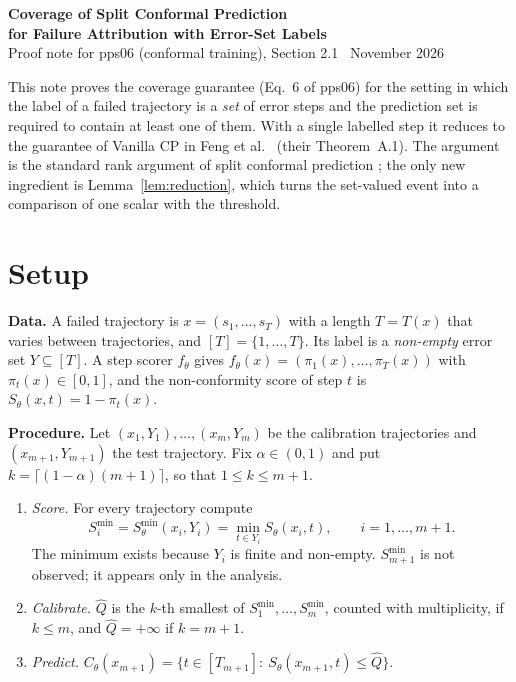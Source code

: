 \documentclass[10pt,a4paper]{article}
\theoremstyle{definition}
\theoremstyle{remark}
\newcommand{\C}{C}
\newcommand{\Qhat}{\widehat Q}
\newcommand{\Smin}{S^{\min}}
\begin{document}
\begin{center}
{\Large\bfseries Coverage of Split Conformal Prediction\\[2pt] for Failure Attribution with Error-Set Labels}\\[4pt]
{\small Proof note for pps06 (conformal training), Section 2.1 \textperiodcentered\ November 2026}
\end{center}

This note proves the coverage guarantee (Eq.~6 of pps06) for the setting in which the label of a failed trajectory is a \emph{set} of error steps and the prediction set is required to contain at least one of them. With a single labelled step it reduces to the guarantee of Vanilla CP in Feng et al.\ \cite{feng2026conformal} (their Theorem~A.1). The argument is the standard rank argument of split conformal prediction \cite{angelopoulos2021gentle}; the only new ingredient is Lemma~\ref{lem:reduction}, which turns the set-valued event into a comparison of one scalar with the threshold.

\section{Setup}

\textbf{Data.} A failed trajectory is $x=(s_1,\dots,s_T)$ with a length $T=T(x)$ that varies between trajectories, and $[T]=\{1,\dots,T\}$. Its label is a \emph{non-empty} error set $Y\subseteq[T]$. A step scorer $f_\theta$ gives $f_\theta(x)=(\pi_1(x),\dots,\pi_T(x))$ with $\pi_t(x)\in[0,1]$, and the non-conformity score of step $t$ is $S_\theta(x,t)=1-\pi_t(x)$.

\textbf{Procedure.} Let $(x_1,Y_1),\dots,(x_m,Y_m)$ be the calibration trajectories and $(x_{m+1},Y_{m+1})$ the test trajectory. Fix $\alpha\in(0,1)$ and put $k=\lceil(1-\alpha)(m+1)\rceil$, so that $1\le k\le m+1$.
\begin{enumerate}
\item \emph{Score.} For every trajectory compute
\begin{equation}
\Smin_i=\Smin_\theta(x_i,Y_i)=\min_{t\in Y_i}S_\theta(x_i,t),\qquad i=1,\dots,m+1. \label{eq:smin}
\end{equation}
The minimum exists because $Y_i$ is finite and non-empty. $\Smin_{m+1}$ is not observed; it appears only in the analysis.
\item \emph{Calibrate.} $\Qhat$ is the $k$-th smallest of $\Smin_1,\dots,\Smin_m$, counted with multiplicity, if $k\le m$, and $\Qhat=+\infty$ if $k=m+1$.
\item \emph{Predict.} $\C_\theta(x_{m+1})=\{t\in[T_{m+1}]:\ S_\theta(x_{m+1},t)\le\Qhat\}$.
\end{enumerate}
\end{document}
